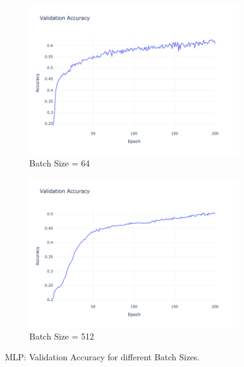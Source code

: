 \clearpage

\begin{figure}[htbp!]
    \centering
    \begin{subfigure}{0.45\textwidth}
        \centering
        \includegraphics[width=\textwidth]{images/mlp-validation-accuracy-batch-64-lr-0.002-epochs-200-hidden-200-dropout-0.3-l2-0.0-layers-2-act-relu-opt-sgd-mom-0.0.png}
        \caption{Batch Size = 64}
    \end{subfigure}
    \hfill
    \begin{subfigure}{0.45\textwidth}
        \centering
        \includegraphics[width=\textwidth]{images/mlp-validation-accuracy-batch-512-lr-0.002-epochs-200-hidden-200-dropout-0.3-l2-0.0-layers-2-act-relu-opt-sgd-mom-0.0.png}
        \caption{Batch Size = 512}
    \end{subfigure}
    \caption{MLP: Validation Accuracy for different Batch Sizes.}
    \label{fig:mlp_batch_size_acc}
\end{figure}



